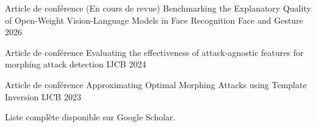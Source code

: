 

\begin{cvhonors}

  \cvhonor
    {Article de conférence (En cours de revue)} %
    {Benchmarking the Explanatory Quality of Open-Weight Vision-Language Models in Face Recognition} %
    {Face and Gesture} %
    {2026} %

  \cvhonor
    {Article de conférence} %
    {Evaluating the effectiveness of attack-agnostic features for morphing attack detection} %
    {IJCB} %
    {2024} %

  \cvhonor
    {Article de conférence} %
    {Approximating Optimal Morphing Attacks using Template Inversion} %
    {IJCB} %
    {2023} %

\end{cvhonors}
\tiny{Liste complète disponible sur Google Scholar.}
